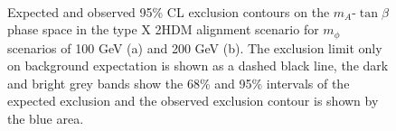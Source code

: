 \begin{figure}[!hbtp]
\centering
     \\
\caption[Plots of the model-dependent limits in the type X 2HDM alignment scenario.]{Expected and observed 95\% CL exclusion contours on the $m_{A}$-$\tan\beta$ phase space in the type X 2HDM alignment scenario for $m_{\phi}$ scenarios of 100 GeV (a) and 200 GeV (b). The exclusion limit only on background expectation is shown as a dashed black line, the dark and bright grey bands show the 68\% and 95\% intervals of the expected exclusion and the observed exclusion contour is shown by the blue area.}
\label{fig:4tau_md}
\end{figure}

